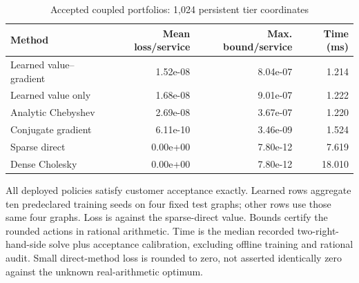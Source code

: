 \begin{table}[!ht]
\centering
\caption{Accepted coupled portfolios: 1,024 persistent tier coordinates}\label{tab:portfolio}
\begin{tabular}{lrrr}\toprule
Method & Mean loss/service & Max. bound/service & Time (ms)\\
\midrule
Learned value--gradient & 1.52e-08 & 8.04e-07 & 1.214\\
Learned value only & 1.68e-08 & 9.01e-07 & 1.222\\
Analytic Chebyshev & 2.69e-08 & 3.67e-07 & 1.220\\
Conjugate gradient & 6.11e-10 & 3.46e-09 & 1.524\\
Sparse direct & 0.00e+00 & 7.80e-12 & 7.619\\
Dense Cholesky & 0.00e+00 & 7.80e-12 & 18.010\\
\bottomrule\end{tabular}
\par\smallskip\begin{minipage}{.98\textwidth}\small All deployed policies satisfy customer acceptance exactly. Learned rows aggregate ten predeclared training seeds on four fixed test graphs; other rows use those same four graphs. Loss is against the sparse-direct value. Bounds certify the rounded actions in rational arithmetic. Time is the median recorded two-right-hand-side solve plus acceptance calibration, excluding offline training and rational audit. Small direct-method loss is rounded to zero, not asserted identically zero against the unknown real-arithmetic optimum.\end{minipage}
\end{table}
